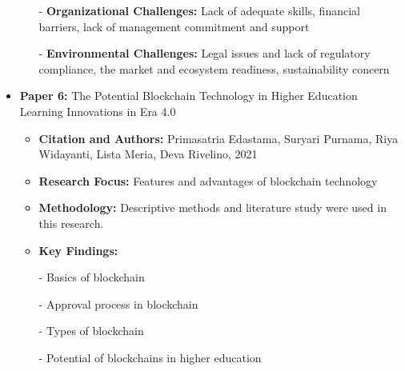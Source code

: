 \documentclass[12pt,a4paper]{article}
\begin{document}
\begin{itemize}
\begin{itemize}
        - \textbf{Organizational Challenges:} Lack of adequate skills, financial barriers, lack of management commitment and support

        - \textbf{Environmental Challenges:} Legal issues and lack of regulatory compliance, the market and ecosystem readiness, sustainability concern
    \end{itemize}
    \vspace{0.2cm}
    \item \textbf{Paper 6:} The Potential Blockchain Technology in Higher Education Learning Innovations in Era 4.0
    \begin{itemize}
        \item \textbf{Citation and Authors:} Primasatria Edastama, Suryari Purnama, Riya Widayanti, Lista Meria, Deva Rivelino, 2021 \cite{p6}
        \item \textbf{Research Focus:} Features and advantages of blockchain technology
        \item \textbf{Methodology:} Descriptive methods and literature study were used in this research.
        \item \textbf{Key Findings:} 

        - Basics of blockchain

        - Approval process in blockchain

        - Types of blockchain

        - Potential of blockchains in higher education
    \end{itemize}


\end{itemize}
\end{document}
